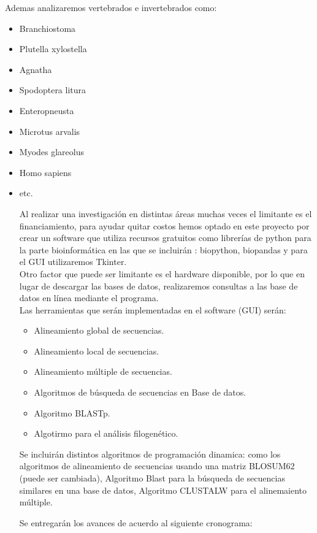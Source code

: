 \documentclass[twocolumn,twoside,12pt]{article}
\begin{document}
Ademas analizaremos vertebrados e invertebrados como:
\begin{itemize}

\item Branchiostoma
\item Plutella xylostella
\item Agnatha
\item Spodoptera litura
\item Enteropneusta
\item Microtus arvalis
\item Myodes glareolus
\item Homo sapiens
\item etc.

Al realizar una investigaci\'on en distintas \'areas muchas veces el limitante  es el financiamiento,  para ayudar quitar costos hemos optado en este proyecto por crear un software que utiliza recursos gratuitos como librer\'ias de python para la parte bioinform\'atica en las que se incluir\'an : biopython, biopandas y para el GUI utilizaremos Tkinter.\\
Otro factor que puede ser limitante es el hardware disponible, por lo que en lugar de descargar las bases de datos, realizaremos consultas a las base de datos en l\'inea mediante el programa.\\

Las herramientas que ser\'an implementadas en el software (GUI) ser\'an: 
\begin{itemize}
 \item Alineamiento global de secuencias. 
 \item Alineamiento local de secuencias. 
 \item Alineamiento m\'ultiple de secuencias.
 \item Algoritmos de b\'usqueda de secuencias en Base de datos.
 \item Algoritmo BLASTp.
 \item Algotirmo para el an\'alisis filogen\'etico.
\end{itemize}

  
Se incluir\'an distintos algoritmos de programaci\'on dinamica: como los algoritmos de alineamiento de secuencias usando una matriz BLOSUM62 (puede ser cambiada), Algoritmo Blast para la b\'usqueda de secuencias similares en una base de datos, Algoritmo CLUSTALW para el alinemaiento m\'ultiple.  

Se entregar\'an los avances de acuerdo al siguiente cronograma:\\


\end{itemize}
\end{document}
